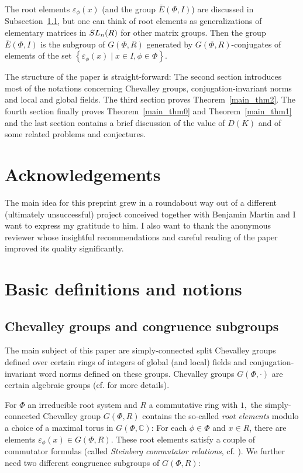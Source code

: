 \documentclass[12pt]{amsart}
\theoremstyle{definition}\newtheorem{definition}[theorem]{Definition}
\theoremstyle{remark}\newtheorem{remark}[theorem]{Remark}
\theoremstyle{definition}\newtheorem{case}{Case}
\begin{document}
The root elements $\varepsilon_{\phi}(x)$ (and the group $\bar{E}(\Phi,I)$) are discussed in Subsection~\ref{chevalley_groups_def}, but one can think of root elements as generalizations of elementary matrices in ${\rm SL}_n(R)$ for other matrix groups. Then the group $\bar{E}(\Phi,I)$ is the subgroup of $G(\Phi,R)$ generated by $G(\Phi,R)$-conjugates of elements of the set $\left\{\varepsilon_{\phi}(x)\mid x\in I,\phi\in\Phi\right\}$.

The structure of the paper is straight-forward: The second section introduces most of the notations concerning Chevalley groups, conjugation-invariant norms and local and global fields. The third section proves Theorem~\ref{main_thm2}. The fourth section finally proves Theorem~\ref{main_thm0} and Theorem~\ref{main_thm1} and the last section contains a brief discussion of the value of $D(K)$ and of some related problems and conjectures.

\section*{Acknowledgements}

The main idea for this preprint grew in a roundabout way out of a different (ultimately unsuccessful) project conceived together with Benjamin Martin and I want to express my gratitude to him. I also want to thank the anonymous reviewer whose insightful recommendations and careful reading of the paper improved its quality significantly.

\section{Basic definitions and notions}\label{definitions}

\subsection{Chevalley groups and congruence subgroups}\label{chevalley_groups_def}

The main subject of this paper are simply-connected split Chevalley groups defined over certain rings of integers of global (and local) fields and conjugation-invariant word norms defined on these groups. Chevalley groups $G(\Phi,\cdot)$ are certain algebraic groups (cf. \cite{MR3616493,General_strong_bound} for more details).

For $\Phi$ an irreducible root system and $R$ a commutative ring with $1,$ the simply-connected Chevalley group $G(\Phi,R)$ contains the so-called \textit{root elements} modulo a choice of a maximal torus in $G(\Phi,\mathbb{C})$: For each $\phi\in\Phi$ and $x\in R$, there are elements $\varepsilon_{\phi}(x)\in G(\Phi,R)$. These root elements satisfy a couple of commutator formulas (called \textit{Steinberg commutator relations}, cf. \cite[Proposition~33.3-5]{MR0396773}). We further need two different congruence subgroups of $G(\Phi,R)$:
\end{document}
